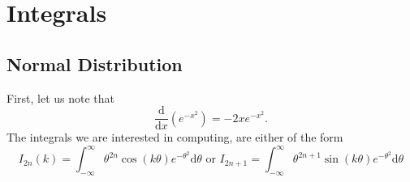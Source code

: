 \documentclass[]{report}
\begin{document}
\chapter{Integrals}
\section{Normal Distribution}
First, let us note that
\[
\frac{\text{d}}{\text{d}x}(e^{- x^2}) = - 2 x e^{ - x ^2}
.\]
The integrals we are interested in computing, are either of the form
\[
	I_{2n}(k) = \int_{- \infty}^{\infty} \theta^{2n} \cos (k \theta) e^{ - \theta^2}\text{d}\theta \text{ or } I_{2n + 1} = \int_{- \infty}^{\infty} \theta^{2n + 1} \sin (k \theta) e^{ - \theta^2}\text{d} \theta
\]



\end{document}
